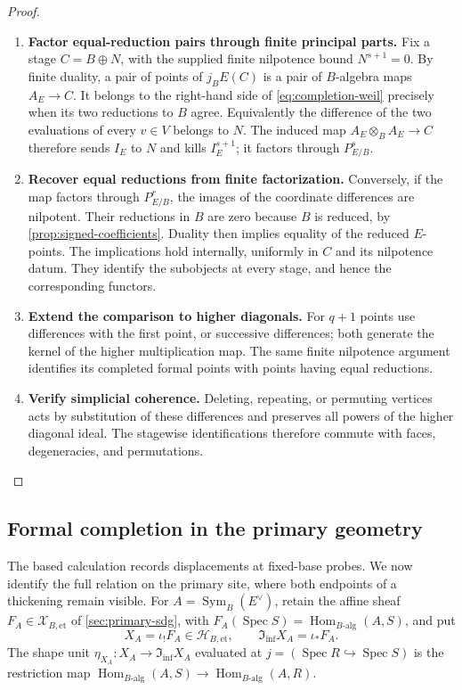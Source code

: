\documentclass[11pt,a4paper]{article}
\numberwithin{algorithm}{section}
\numberwithin{equation}{section}
\theoremstyle{definition}
\theoremstyle{remark}
\theoremstyle{plain}
\newcommand{\Sym}{\operatorname{Sym}}
\newcommand{\Hom}{\operatorname{Hom}}
\newcommand{\InfShape}{\mathfrak I_{\mathrm{inf}}}
\newcommand{\BaseEt}{\mathscr X_{B,\mathrm{et}}}
\newcommand{\ThickEt}{\mathscr H_{B,\mathrm{et}}}
\theoremstyle{definition}
\theoremstyle{plain}
\begin{document}
\begin{proof}\leavevmode
\begin{enumerate}[leftmargin=*,align=left]
\item \textbf{Factor equal-reduction pairs through finite principal parts.}
Fix a stage $C=B\oplus N$, with the supplied finite nilpotence
bound $N^{s+1}=0$.  By finite duality, a pair of points of $j_BE(C)$
is a pair of $B$-algebra maps $A_E\to C$.  It belongs to the
right-hand side of \eqref{eq:completion-weil} precisely when its
two reductions to $B$ agree.  Equivalently the difference of the
two evaluations of every $v\in V$ belongs to $N$.  The induced map
$A_E\otimes_BA_E\to C$ therefore sends $I_E$ to $N$ and kills
$I_E^{s+1}$; it factors through $P^s_{E/B}$.

\item \textbf{Recover equal reductions from finite factorization.}
Conversely, if the map factors through $P^r_{E/B}$, the images of
the coordinate differences are nilpotent.  Their reductions in $B$
are zero because $B$ is reduced, by
\cref{prop:signed-coefficients}.  Duality then implies equality
of the reduced $E$-points.  The implications hold internally,
uniformly in $C$ and its nilpotence datum.  They identify the
subobjects at every stage, and hence the corresponding functors.

\item \textbf{Extend the comparison to higher diagonals.}
For $q+1$ points use differences with the first point, or
successive differences; both generate the kernel of the higher
multiplication map.  The same finite nilpotence argument identifies
its completed formal points with points having equal reductions.

\item \textbf{Verify simplicial coherence.}
Deleting, repeating, or permuting vertices acts by substitution of
these differences and preserves all powers of the higher diagonal
ideal.  The stagewise identifications therefore commute with faces,
degeneracies, and permutations.
\end{enumerate}
\end{proof}


\subsection{Formal completion in the primary geometry}
\label{sec:formal-etale-completion}
The based calculation records displacements at fixed-base probes.
We now identify the full relation on the primary site, where both
endpoints of a thickening remain visible. For
$A=\Sym_B(E^\vee)$, retain the affine sheaf
$F_A\in\BaseEt$ of \cref{sec:primary-sdg}, with
$F_A(\operatorname{Spec}S)=\Hom_{B\text{-alg}}(A,S)$, and put
\[
 X_A=\iota_!F_A\in\ThickEt,
 \qquad\InfShape X_A=\iota_*F_A.
\]
The shape unit $\eta_{X_A}:X_A\to\InfShape X_A$
evaluated at $j=(\operatorname{Spec}R\hookrightarrow
\operatorname{Spec}S)$ is the restriction map
$\Hom_{B\text{-alg}}(A,S)\to\Hom_{B\text{-alg}}(A,R)$.
\end{document}
